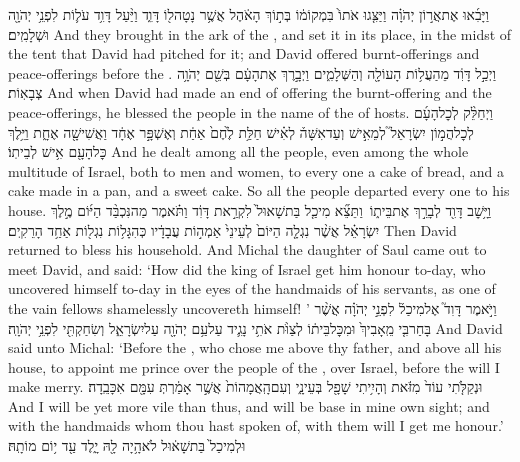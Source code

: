 {וַיָּבִ֜אוּ אֶת\maqqaf אֲר֣וֹן יְהֹוָ֗ה וַיַּצִּ֤גוּ אֹתוֹ֙ בִּמְקוֹמ֔וֹ בְּת֣וֹךְ הָאֹ֔הֶל אֲשֶׁ֥ר נָטָה\maqqaf ל֖וֹ דָּוִ֑ד וַיַּ֨עַל דָּוִ֥ד עֹל֛וֹת לִפְנֵ֥י יְהֹוָ֖ה וּשְׁלָמִֽים׃}
{And they brought in the ark of the \lord, and set it in its place, in the midst of the tent that David had pitched for it; and David offered burnt-offerings and peace-offerings before the \lord.}
{וַיְכַ֣ל דָּוִ֔ד מֵהַעֲל֥וֹת הָעוֹלָ֖ה וְהַשְּׁלָמִ֑ים וַיְבָ֣רֶךְ אֶת\maqqaf הָעָ֔ם בְּשֵׁ֖ם יְהֹוָ֥ה צְבָאֽוֹת׃}
{And when David had made an end of offering the burnt-offering and the peace-offerings, he blessed the people in the name of the \lord\space of hosts.}
{וַיְחַלֵּ֨ק לְכׇל\maqqaf הָעָ֜ם לְכׇל\maqqaf הֲמ֣וֹן יִשְׂרָאֵל֮ לְמֵאִ֣ישׁ וְעַד\maqqaf אִשָּׁה֒ לְאִ֗ישׁ חַלַּ֥ת לֶ֙חֶם֙ אַחַ֔ת וְאֶשְׁפָּ֣ר אֶחָ֔ד וַאֲשִׁישָׁ֖ה אֶחָ֑ת וַיֵּ֥לֶךְ כׇּל\maqqaf הָעָ֖ם אִ֥ישׁ לְבֵיתֽוֹ׃}
{And he dealt among all the people, even among the whole multitude of Israel, both to men and women, to every one a cake of bread, and a cake made in a pan, and a sweet cake. So all the people departed every one to his house.}
{וַיָּ֥שׇׁב דָּוִ֖ד לְבָרֵ֣ךְ אֶת\maqqaf בֵּית֑וֹ \setuma  וַתֵּצֵ֞א מִיכַ֤ל בַּת\maqqaf שָׁאוּל֙ לִקְרַ֣את דָּוִ֔ד וַתֹּ֗אמֶר מַה\maqqaf נִּכְבַּ֨ד הַיּ֜וֹם מֶ֣לֶךְ יִשְׂרָאֵ֗ל אֲשֶׁ֨ר נִגְלָ֤ה הַיּוֹם֙ לְעֵינֵי֙ אַמְה֣וֹת עֲבָדָ֔יו כְּהִגָּל֥וֹת נִגְל֖וֹת אַחַ֥ד הָרֵקִֽים׃}
{Then David returned to bless his household. And Michal the daughter of Saul came out to meet David, and said: ‘How did the king of Israel get him honour to-day, who uncovered himself to-day in the eyes of the handmaids of his servants, as one of the vain fellows shamelessly uncovereth himself! ’}
{וַיֹּ֣אמֶר דָּוִד֮ אֶל\maqqaf מִיכַל֒ לִפְנֵ֣י יְהֹוָ֗ה אֲשֶׁ֨ר בָּחַר\maqqaf בִּ֤י מֵֽאָבִיךְ֙ וּמִכׇּל\maqqaf בֵּית֔וֹ לְצַוֺּ֨ת אֹתִ֥י נָגִ֛יד עַל\maqqaf עַ֥ם יְהֹוָ֖ה עַל\maqqaf יִשְׂרָאֵ֑ל וְשִׂחַקְתִּ֖י לִפְנֵ֥י יְהֹוָֽה׃}
{And David said unto Michal: ‘Before the \lord, who chose me above thy father, and above all his house, to appoint me prince over the people of the \lord, over Israel, before the \lord\space will I make merry.}
{וּנְקַלֹּ֤תִי עוֹד֙ מִזֹּ֔את וְהָיִ֥יתִי שָׁפָ֖ל בְּעֵינָ֑י וְעִם\maqqaf הָֽאֲמָהוֹת֙ אֲשֶׁ֣ר אָמַ֔רְתְּ עִמָּ֖ם אִכָּבֵֽדָה׃}
{And I will be yet more vile than thus, and will be base in mine own sight; and with the handmaids whom thou hast spoken of, with them will I get me honour.’}
{וּלְמִיכַל֙ בַּת\maqqaf שָׁא֔וּל לֹא\maqqaf הָ֥יָה לָ֖הּ יָ֑לֶד עַ֖ד י֥וֹם מוֹתָֽהּ׃ \petucha }
